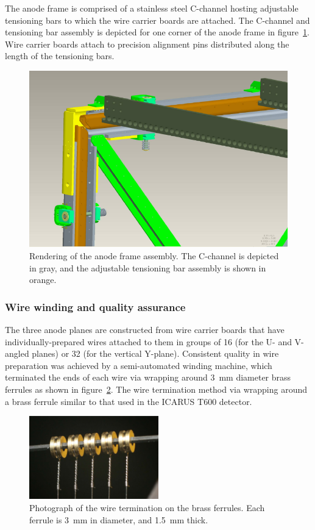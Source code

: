 The anode frame is comprised of a stainless steel C-channel hosting adjustable tensioning bars to which the wire carrier boards are attached. The C-channel and tensioning bar assembly is depicted for one corner of the anode frame in figure~\ref{fig:anode-frame-3dmodel}.  Wire carrier boards attach to precision alignment pins distributed along the length of the tensioning bars. 

\begin{figure}
\centering	
\includegraphics[width=0.8\linewidth]{figures/anode-frame-3dmodel.pdf}
\caption{Rendering of the anode frame assembly.  The C-channel is depicted in gray, and the adjustable tensioning bar assembly is shown in orange.}
\label{fig:anode-frame-3dmodel}
\end{figure}

\subsubsection{Wire winding and quality assurance}

The three anode planes are constructed from wire carrier boards that have individually-prepared wires attached to them in groups of 16 (for the U- and V- angled planes) or 32 (for the vertical Y-plane).  Consistent quality in wire preparation was achieved by a semi-automated winding machine, which terminated the ends of each wire via wrapping around 3~mm diameter brass ferrules as shown in figure~\ref{fig:ferrules}.   The wire termination method via wrapping around a brass ferrule similar to that used in the ICARUS T600 detector.  
\begin{figure}
\centering
\includegraphics[width=0.5\textwidth]{figures/wire-twist.pdf}
\caption{Photograph of the wire termination on the brass ferrules.  Each ferrule is 3~mm in diameter, and 1.5~mm thick.}
\label{fig:ferrules}
\end{figure}

